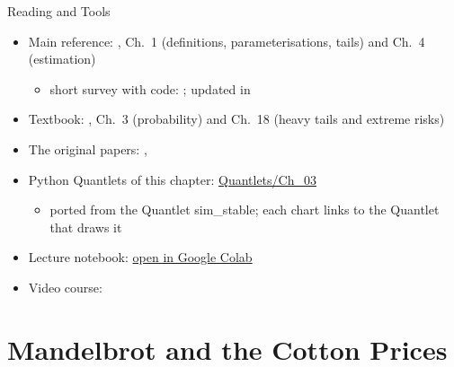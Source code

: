 \begin{frame}{Reading and Tools}
\itemsize{\small}
\begin{itemize}
    \item Main reference: , Ch.~1 (definitions, parameterisations, tails) and Ch.~4 (estimation)
    \begin{itemize}
        \item short survey with code: ; updated in 
    \end{itemize}
    \item Textbook: , Ch.~3 (probability) and Ch.~18 (heavy tails and extreme risks)
    \item The original papers: , 
    \item Python Quantlets of this chapter: \href{https://github.com/danpele/SFM/tree/main/Quantlets/Ch_03}{Quantlets/Ch\_03}
    \begin{itemize}
        \item ported from the Quantlet sim\_stable; each chart links to the Quantlet that draws it
    \end{itemize}
    \item Lecture notebook: \href{\colaburl{notebooks/EN/chapter3_lecture_notebook.ipynb}}{open in Google Colab}
    \item Video course: 
\end{itemize}
\end{frame}


\section{Mandelbrot and the Cotton Prices}

